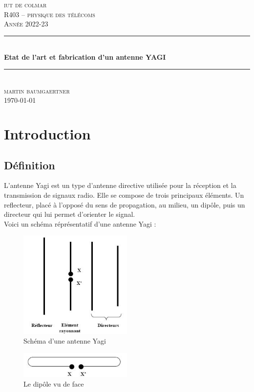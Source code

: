 \documentclass[12pt, a4paper]{article}
\begin{document}
\begin{titlepage}
	\newcommand{\HRule}{\rule{\linewidth}{0.5mm}} 
	\center 
	\textsc{\LARGE iut de colmar}\\[6.5cm] 
	\textsc{\Large R403 -- physique des télécoms}\\[0.5cm] 
	\textsc{\large Année 2022-23}\\[0.5cm]
	\HRule\\[0.75cm]
	{\Large\bfseries Etat de l'art et fabrication d'un antenne YAGI}\\[0.4cm]
	\HRule\\[1.5cm]
	\textsc{\large martin baumgaertner}\\[6cm] 

	\vfill\vfill\vfill
	{\large\today} 
	\vfill
\end{titlepage}
\newpage
\tableofcontents
\listoffigures
\newpage
\section{Introduction}
\subsection{Définition}
L'antenne Yagi est un type d'antenne directive utilisée 
pour la réception et la transmission de signaux radio. 
Elle se compose de trois principaux éléments. Un reflecteur,
placé à l'opposé du sens de propagation, au milieu, 
un dipôle, puis un directeur qui lui permet d'orienter
le signal.\\

Voici un schéma réprésentatif d'une antenne Yagi :
\begin{figure}[h]
    \centering
    \includegraphics[width=0.5\textwidth]{img/yagi.jpg}
    \caption{Schéma d'une antenne Yagi \cite{r1}}
    \label{fig:yagi}
\end{figure}

\begin{figure}[h]
    \centering
    \includegraphics[width=0.5\textwidth]{img/trombone-yagi.jpg}
    \caption{Le dipôle vu de face \cite{r1}}
    \label{fig:yagi-de-face}
\end{figure}
\end{document}
